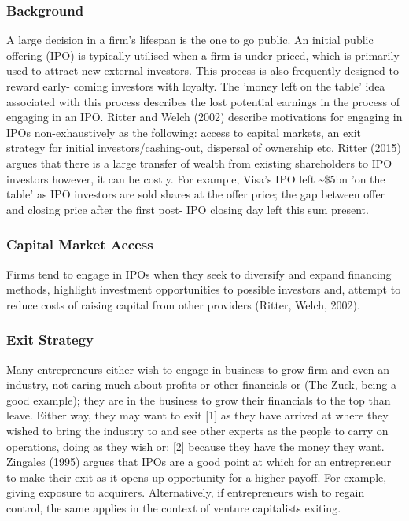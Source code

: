 \documentclass[11pt, english]{article}
\begin{document}
		\subsubsection*{Background}

	A large decision in a firm's lifespan is the one to go public. An initial public offering (IPO) is typically utilised when a firm is under-priced, which is primarily used to attract new external investors. This process is also frequently designed to reward early- coming investors with loyalty. The 'money left on the table' idea associated with this process describes the lost potential earnings in the process of engaging in an IPO. Ritter and Welch (2002) describe motivations for engaging in IPOs non-exhaustively as the following: access to capital markets, an exit strategy for initial investors/cashing-out, dispersal of ownership etc. Ritter (2015) argues that there is a large transfer of wealth from existing shareholders to IPO investors however, it can be costly. For example, Visa's IPO left \~{}\$5bn 'on the table' as IPO investors are sold shares at the offer price; the gap between offer and closing price after the first post- IPO closing day left this sum present.

		\subsubsection*{Capital Market Access}

	Firms tend to engage in IPOs when they seek to diversify and expand financing methods, highlight investment opportunities to possible investors and, attempt to reduce costs of raising capital from other providers (Ritter, Welch, 2002).

		\subsubsection*{Exit Strategy}

	Many entrepreneurs either wish to engage in business to grow firm and even an industry, not caring much about profits or other financials or (The Zuck, being a good example); they are in the business to grow their financials to the top than leave. Either way, they may want to exit [1] as they have arrived at where they wished to bring the industry to and see other experts as the people to carry on operations, doing as they wish or; [2] because they have the money they want. Zingales (1995) argues that IPOs are a good point at which for an entrepreneur to make their exit as it opens up opportunity for a higher-payoff. For example, giving exposure to acquirers. Alternatively, if entrepreneurs wish to regain control, the same applies in the context of venture capitalists exiting.
\end{document}
